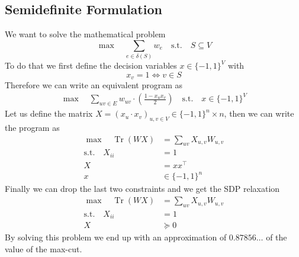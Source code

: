 \documentclass[answers]{exam}
\begin{document}
\subsection{Semidefinite Formulation}
    We want to solve the mathematical problem 
    $$ \max \quad \sum_{e\in \delta(S)} w_e\quad \text{s.t.}\quad S\subseteq V $$
    To do that we first define the decision variables $x\in \{-1,1\}^{V}$ with 
    $$ x_v = 1 \iff v\in S $$
    Therefore we can write an equivalent program as 
    \begin{align*}
        \max\quad  \sum_{uv\in E} w_{uv} \cdot \left(\frac{1-x_ux_v}{2}\right) \quad \text{s.t.}\quad x\in \{-1,1\}^V
    \end{align*}
    Let us define the matrix $X = (x_u\cdot x_v)_{u,v\in V} \in \{-1,1\}^n\times n$, then we can write the program as 
    \begin{align*}
        \max \quad \operatorname{Tr}(WX) &= \sum_{uv} X_{u,v} W_{u,v} \\ 
        \text{s.t.}\quad X_{ii} &= 1 \\ 
        X &= xx^\top \\ 
        x&\in \{-1,1\}^n 
    \end{align*}
    Finally we can drop the last two constraints and we get the SDP relaxation 
    \begin{align*}
        \max \quad \operatorname{Tr}(WX) &= \sum_{uv} X_{u,v} W_{u,v} \\ 
        \text{s.t.}\quad X_{ii} &= 1 \\ 
        X&\succeq 0 
    \end{align*}
    By solving this problem we end up with an approximation of $0.87856\ldots$ of the value of the max-cut. 
\end{document}
